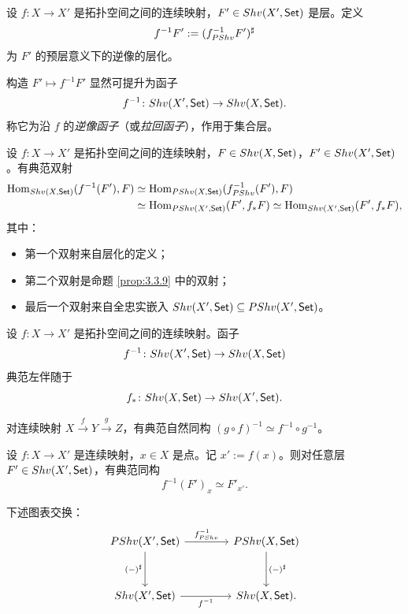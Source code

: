 \begin{construction}\label{con:3.4.1}
设 $f\colon X\to X'$ 是拓扑空间之间的连续映射，$F'\in Shv(X',\mathsf{Set})$ 是层。定义
\[
f^{-1}F':=(f_{PShv}^{-1}F')^{\sharp}
\]
为 $F'$ 的预层意义下的逆像的层化。

构造 $F'\mapsto f^{-1}F'$ 显然可提升为函子
\[
f^{-1}\colon Shv(X',\mathsf{Set})\to Shv(X,\mathsf{Set}).
\]
称它为沿 $f$ 的\emph{逆像函子}（或\emph{拉回函子}），作用于集合层。

设 $f\colon X\to X'$ 是拓扑空间之间的连续映射，$F\in Shv(X,\mathsf{Set})$，$F'\in Shv(X',\mathsf{Set})$。有典范双射
\[
\begin{aligned}
\operatorname{Hom}_{Shv(X,\mathsf{Set})}(f^{-1}(F'),F)&\simeq\operatorname{Hom}_{PShv(X,\mathsf{Set})}(f_{PShv}^{-1}(F'),F)\\
&\simeq\operatorname{Hom}_{PShv(X',\mathsf{Set})}(F',f_*F)\simeq\operatorname{Hom}_{Shv(X',\mathsf{Set})}(F',f_*F),
\end{aligned}
\]
其中：
\begin{itemize}
  \item 第一个双射来自层化的定义；
  \item 第二个双射是命题 \ref{prop:3.3.9} 中的双射；
  \item 最后一个双射来自全忠实嵌入 $Shv(X',\mathsf{Set})\subseteq PShv(X',\mathsf{Set})$。
\end{itemize}
\end{construction}

\begin{corollary}\label{cor:3.4.2}
设 $f\colon X\to X'$ 是拓扑空间之间的连续映射。函子
\[
f^{-1}\colon Shv(X',\mathsf{Set})\to Shv(X,\mathsf{Set})
\]
典范左伴随于
\[
f_*\colon Shv(X,\mathsf{Set})\to Shv(X',\mathsf{Set}).
\]
\end{corollary}

\begin{corollary}\label{cor:3.4.3}
对连续映射 $X\xrightarrow{\ f\ }Y\xrightarrow{\ g\ }Z$，有典范自然同构 $(g\circ f)^{-1}\simeq f^{-1}\circ g^{-1}$。
\end{corollary}

\begin{corollary}\label{cor:3.4.4}
设 $f\colon X\to X'$ 是连续映射，$x\in X$ 是点。记 $x':=f(x)$。则对任意层 $F'\in Shv(X',\mathsf{Set})$，有典范同构
\[
f^{-1}(F')_x\simeq F'_{x'}.
\]
\end{corollary}

\begin{exercise}\label{exc:3.4.5}
下述图表交换：
\[
\begin{tikzcd}[row sep=3.2em,column sep=4em]
\PShv(X',\Set) \arrow[r,"f_{\PShv}^{-1}"] \arrow[d,"(-)^{\sharp}"'] & \PShv(X,\Set) \arrow[d,"(-)^{\sharp}"] \\
\Shv(X',\Set) \arrow[r,"f^{-1}"'] & \Shv(X,\Set).
\end{tikzcd}
\]
\end{exercise}

